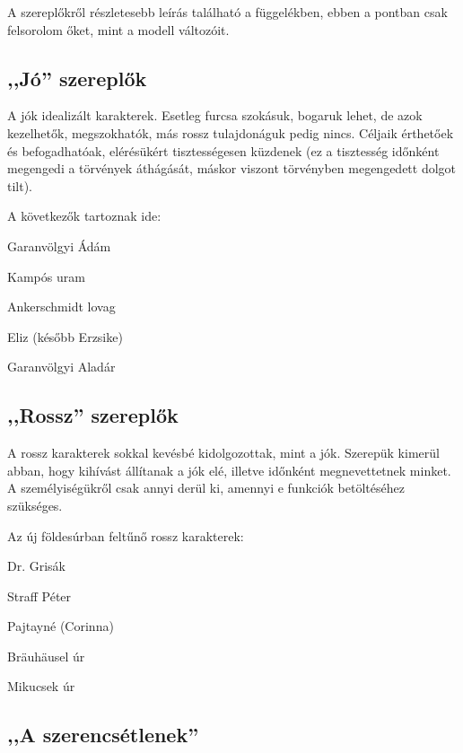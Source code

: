 \documentclass[a4paper,12pt]{thesis-ekf}
\begin{document}
    A szereplőkről részletesebb leírás található a függelékben, ebben a pontban csak felsorolom őket, mint a modell változóit.

    \subsection{,,Jó'' szereplők}

    A jók idealizált karakterek.
    Esetleg furcsa szokásuk, bogaruk lehet, de azok kezelhetők, megszokhatók, más rossz tulajdonáguk pedig nincs.
    Céljaik érthetőek és befogadhatóak, elérésükért tisztességesen küzdenek
        (ez a tisztesség időnként megengedi a törvények áthágását, máskor viszont törvényben megengedett dolgot tilt).

    A következők tartoznak ide:

    \begin{compactitem}
        \item Garanvölgyi Ádám
        \item Kampós uram
        \item Ankerschmidt lovag
        \item Eliz (később Erzsike)
        \item Garanvölgyi Aladár
    \end{compactitem}

    \subsection{,,Rossz'' szereplők}

    A rossz karakterek sokkal kevésbé kidolgozottak, mint a jók.
    Szerepük kimerül abban, hogy kihívást állítanak a jók elé, illetve időnként megnevettetnek minket.
    A személyiségükről csak annyi derül ki, amennyi e funkciók betöltéséhez szükséges.

    Az új földesúrban feltűnő rossz karakterek:

    \begin{compactitem}
        \item Dr. Grisák
        \item Straff Péter
        \item Pajtayné (Corinna)
        \item Bräuhäusel úr
        \item Mikucsek úr
    \end{compactitem}

    \subsection{,,A szerencsétlenek''}
\end{document}
